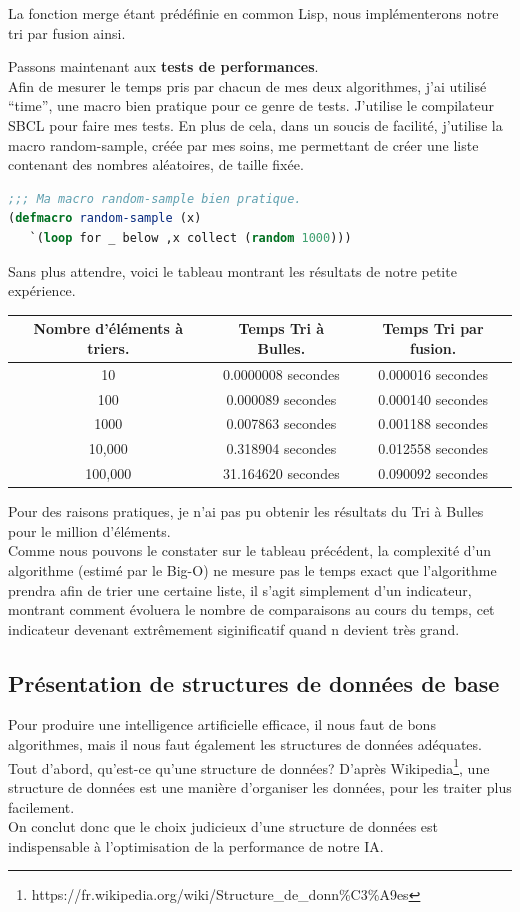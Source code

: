 \documentclass[a4paper, 12pt]{article}
\numberwithin{equation}{subsection}
\begin{document}
La fonction merge étant prédéfinie en common Lisp, nous implémenterons notre tri par fusion ainsi.

Passons maintenant aux {\bf tests de performances}. \\
Afin de mesurer le temps pris par chacun de mes deux algorithmes, j'ai utilisé ``time'', une macro bien pratique pour ce genre de tests. J'utilise le compilateur SBCL pour faire mes tests. En plus de cela, dans un soucis de facilité, j'utilise la macro random-sample, créée par mes soins, me permettant de créer une liste contenant des nombres aléatoires, de taille fixée. \\
\begin{lstlisting}[language=Lisp]
;;; Ma macro random-sample bien pratique.
(defmacro random-sample (x)
   `(loop for _ below ,x collect (random 1000)))
\end{lstlisting}
Sans plus attendre, voici le tableau montrant les résultats de notre petite expérience.
\begin{table}[H]
  \begin{tabular}{|c|c|c|}
    \hline {\bf Nombre d'éléments à triers.} & {\bf Temps Tri à Bulles.} & {\bf Temps Tri par fusion.} \\
    \hline 10 & 0.0000008 secondes & 0.000016 secondes \\
    100 & 0.000089 secondes & 0.000140 secondes \\
    1000 & 0.007863 secondes & 0.001188 secondes \\
    10,000 & 0.318904 secondes & 0.012558 secondes \\
    100,000 & 31.164620 secondes & 0.090092 secondes \\
    \hline
  \end{tabular}
\end{table} \smallskip
Pour des raisons pratiques, je n'ai pas pu obtenir les résultats du Tri à Bulles pour le million d'éléments. \\
Comme nous pouvons le constater sur le tableau précédent, la complexité d'un algorithme (estimé par le Big-O) ne mesure pas le temps exact que l'algorithme prendra afin de trier une certaine liste, il s'agit simplement d'un indicateur, montrant comment évoluera le nombre de comparaisons au cours du temps, cet indicateur devenant extrêmement siginificatif quand n devient très grand. \\[0.5cm]
\subsection{Présentation de structures de données de base}
Pour produire une intelligence artificielle efficace, il nous faut de bons algorithmes, mais il nous faut également les structures de données adéquates. \\
Tout d'abord, qu'est-ce qu'une structure de données?
D'après Wikipedia\footnote{https://fr.wikipedia.org/wiki/Structure\_de\_donn\%C3\%A9es}, une structure de données est une manière d'organiser les données, pour les traiter plus facilement. \\
On conclut donc que le choix judicieux d'une structure de données est indispensable à l'optimisation de la performance de notre IA.
\end{document}
